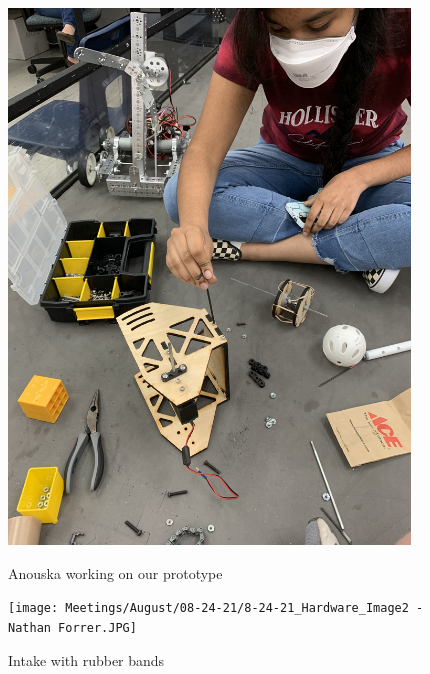 \begin{figure}[ht]
\centering
\begin{minipage}[b]{.48\textwidth}
  \centering
  \includegraphics[width=0.95\textwidth]{Meetings/August/08-24-21/8-24-21_Hardware_Image1 - Nathan Forrer.JPG}
  \caption{Anouska working on our prototype}
  \label{fig:pic1}
\end{minipage}%
\hfill%
\begin{minipage}[b]{.48\textwidth}
  \centering
  \texttt{[image: Meetings/August/08-24-21/8-24-21\_Hardware\_Image2 - Nathan Forrer.JPG]}
  \caption{Intake with rubber bands}
  \label{fig:pic2}
\end{minipage}
\end{figure}

